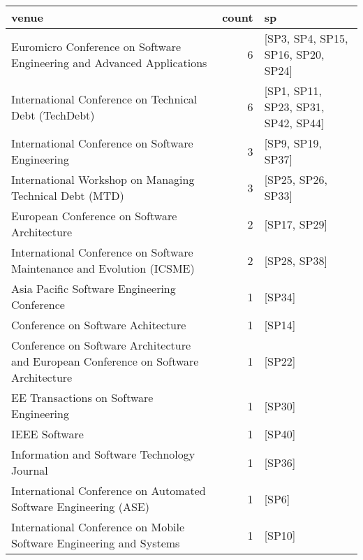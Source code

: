 \begin{tabular}{lrl}
\toprule
                                                                                venue &  count &                                   sp \\
\midrule
               Euromicro Conference on Software Engineering and Advanced Applications &      6 &   [SP3, SP4, SP15, SP16, SP20, SP24] \\
                                International Conference on Technical Debt (TechDebt) &      6 &  [SP1, SP11, SP23, SP31, SP42, SP44] \\
                                     International Conference on Software Engineering &      3 &                    [SP9, SP19, SP37] \\
                              International Workshop on Managing Technical Debt (MTD) &      3 &                   [SP25, SP26, SP33] \\
                                         European Conference on Software Architecture &      2 &                         [SP17, SP29] \\
               International Conference on Software Maintenance and Evolution (ICSME) &      2 &                         [SP28, SP38] \\
                                         Asia Pacific Software Engineering Conference &      1 &                               [SP34] \\
                                                   Conference on Software Achitecture &      1 &                               [SP14] \\
 Conference on Software Architecture and European Conference on Software Architecture &      1 &                               [SP22] \\
                                              EE Transactions on Software Engineering &      1 &                               [SP30] \\
                                                                        IEEE Software &      1 &                               [SP40] \\
                                          Information and Software Technology Journal &      1 &                               [SP36] \\
                     International Conference on Automated Software Engineering (ASE) &      1 &                                [SP6] \\
                  International Conference on Mobile Software Engineering and Systems &      1 &                               [SP10] \\

\end{tabular}

